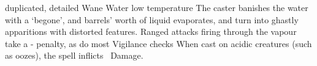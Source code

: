   {duplicated, detailed}%
  {Wane}%
  {Water}%
  {low temperature}%
  {The caster banishes the water with a `begone', and  barrels' worth of liquid evaporates, and turn into ghastly apparitions with distorted features.
  Ranged attacks firing through the vapour take a - penalty, as do most Vigilance checks}%
  {
  When cast on acidic creatures (such as oozes), the spell inflicts \showDam\ Damage.}
